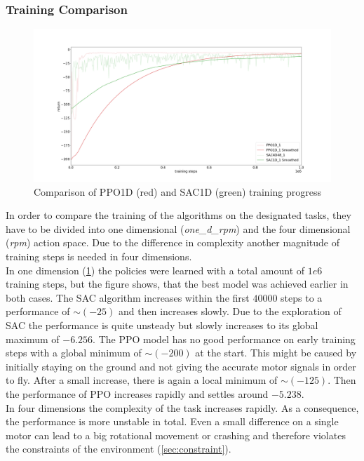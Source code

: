 \subsubsection{Training Comparison}
\begin{figure}
	\centering
	\includegraphics[width=\linewidth]{figures/1Dtrain.png}
	\caption{Comparison of PPO1D (red) and SAC1D (green) training progress}
	\label{fig:train1D}
\end{figure}
In order to compare the training of the algorithms on the designated tasks,
they have to be divided into one dimensional (\emph{one\_d\_rpm}) and the 
four dimensional (\emph{rpm}) action space. Due to the difference in complexity
another magnitude of training steps is needed in four dimensions.\\
In one dimension (\cref{fig:train1D}) the policies were learned with a total amount
of $1e6$ training steps, but the figure shows, that the best model was
achieved earlier in both cases. The SAC algorithm increases within the first 
$40000$ steps to a performance of $\sim (-25)$ and then increases slowly.
Due to the exploration of SAC the performance is quite unsteady but slowly
increases to its global maximum of $-6.256$.
The PPO model has no good performance on early training steps with a global 
minimum of $\sim (-200)$ at the start. This might be caused by initially
staying on the ground and not giving the accurate motor
signals in order to fly. After a small increase, there is again a
local minimum of $\sim (-125)$.
Then the performance of PPO increases rapidly and settles around $-5.238$.\\
In four dimensions the complexity of the task increases rapidly. 
As a consequence, the performance is more unstable in total.
Even a small difference on a single motor can lead to a big rotational movement or
crashing and therefore violates the constraints of the environment (\cref{sec:constraint}).
